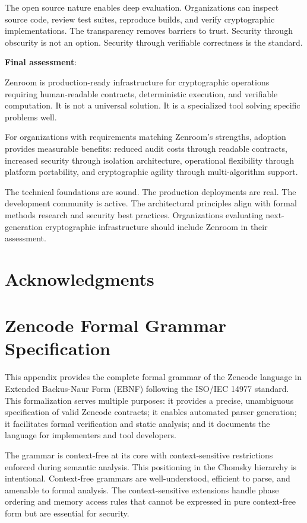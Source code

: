 The open source nature enables deep evaluation. Organizations can
inspect source code, review test suites, reproduce builds, and verify
cryptographic implementations. The transparency removes barriers to
trust. Security through obscurity is not an option. Security through
verifiable correctness is the standard.

\textbf{Final assessment}:

Zenroom is production-ready infrastructure for cryptographic
operations requiring human-readable contracts, deterministic
execution, and verifiable computation. It is not a universal
solution. It is a specialized tool solving specific problems well.

For organizations with requirements matching Zenroom's strengths,
adoption provides measurable benefits: reduced audit costs through
readable contracts, increased security through isolation architecture,
operational flexibility through platform portability, and
cryptographic agility through multi-algorithm support.

The technical foundations are sound. The production deployments are
real. The development community is active. The architectural
principles align with formal methods research and security best
practices. Organizations evaluating next-generation cryptographic
infrastructure should include Zenroom in their assessment.

\section*{Acknowledgments}

 

\appendix
\section{Zencode Formal Grammar Specification}

This appendix provides the complete formal grammar of the Zencode
language in Extended Backus-Naur Form (EBNF) following the ISO/IEC
14977 standard. This formalization serves multiple purposes: it
provides a precise, unambiguous specification of valid Zencode
contracts; it enables automated parser generation; it facilitates
formal verification and static analysis; and it documents the language
for implementers and tool developers.

The grammar is context-free at its core with context-sensitive
restrictions enforced during semantic analysis. This positioning in
the Chomsky hierarchy is intentional. Context-free grammars are
well-understood, efficient to parse, and amenable to formal
analysis. The context-sensitive extensions handle phase ordering and
memory access rules that cannot be expressed in pure context-free form
but are essential for security.

